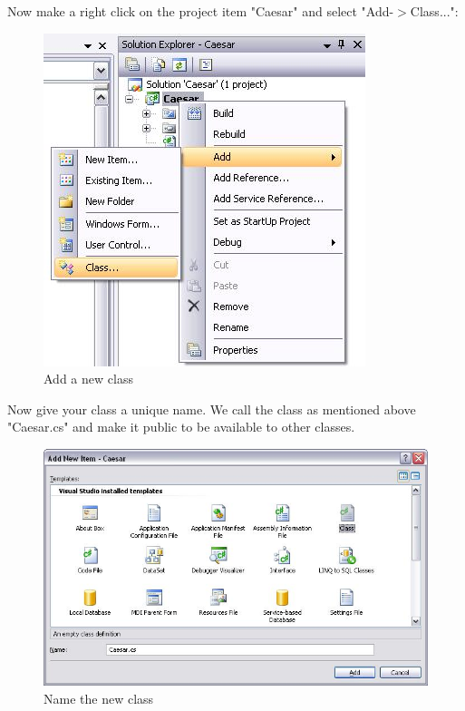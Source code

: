 Now make a right click on the project item "Caesar" and select "Add-$>$Class...":
\begin{figure}[h]
	\centering
		\includegraphics{figures/add_new_class.jpg}
	\caption{Add a new class}
	\label{fig:add_new_class}
\end{figure}\clearpage
Now give your class a unique name. We call the class as mentioned above "Caesar.cs" and make it public to be available to other classes.
\begin{figure}[h!]
	\centering
		\includegraphics[width=1.00\textwidth]{figures/name_new_class.jpg}
	\caption{Name the new class}
	\label{fig:name_new_class}
\end{figure}
